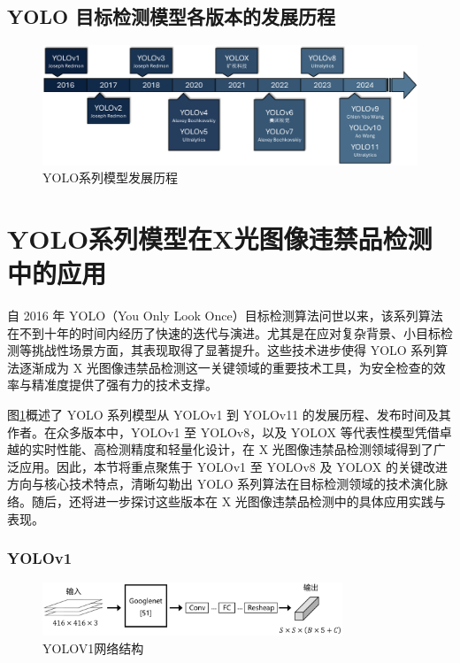 \documentclass[11pt,twocolumn]{ctexart}
\begin{document}
\subsection{YOLO 目标检测模型各版本的发展历程}

\begin{figure}[!htbp]
  \begin{center}
    \includegraphics[width=\textwidth]{发展流程图}
    \end{center}
  \caption{YOLO系列模型发展历程}
  \label{发展流程}
\end{figure}

\section{YOLO系列模型在X光图像违禁品检测中的应用}

自 2016 年 YOLO（You Only Look Once）目标检测算法问世以来，该系列算法在不到十年的时间内经历了快速的迭代与演进。尤其是在应对复杂背景、小目标检测等挑战性场景方面，其表现取得了显著提升。这些技术进步使得 YOLO 系列算法逐渐成为 X 光图像违禁品检测这一关键领域的重要技术工具，为安全检查的效率与精准度提供了强有力的技术支撑。

图\ref{发展流程}概述了 YOLO 系列模型从 YOLOv1 到 YOLOv11 的发展历程、发布时间及其作者。在众多版本中，YOLOv1 至 YOLOv8，以及 YOLOX 等代表性模型凭借卓越的实时性能、高检测精度和轻量化设计，在 X 光图像违禁品检测领域得到了广泛应用。因此，本节将重点聚焦于 YOLOv1 至 YOLOv8 及 YOLOX 的关键改进方向与核心技术特点，清晰勾勒出 YOLO 系列算法在目标检测领域的技术演化脉络。随后，还将进一步探讨这些版本在 X 光图像违禁品检测中的具体应用实践与表现。




\subsubsection{YOLOv1}

\begin{figure}[!hbtp]
  \begin{center}
  \includegraphics[width=0.8\textwidth]{YOLOV1结构图}
    \end{center}
  \caption{YOLOV1网络结构}
  \label{YOLOV1网络结构}
\end{figure}
\end{document}
